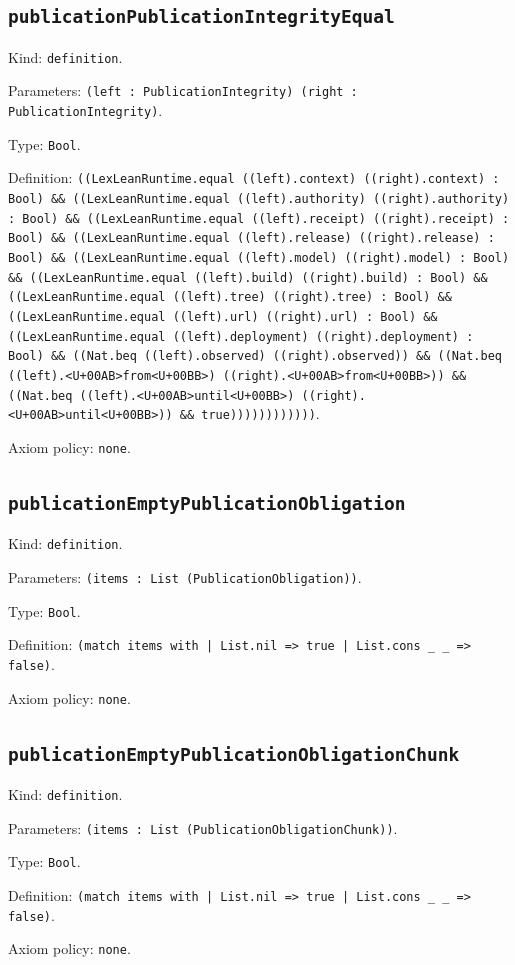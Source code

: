 \documentclass[11pt]{article}
\begin{document}
\subsection*{\texttt{publicationPublicationIntegrityEqual}}
\noindent Kind: \texttt{definition}.\par
\noindent Parameters: \texttt{(left : PublicationIntegrity) (right : PublicationIntegrity)}.\par
\noindent Type: \texttt{Bool}.\par
\noindent Definition: \texttt{((LexLeanRuntime.equal ((left).context) ((right).context) : Bool) \&\& ((LexLeanRuntime.equal ((left).authority) ((right).authority) : Bool) \&\& ((LexLeanRuntime.equal ((left).receipt) ((right).receipt) : Bool) \&\& ((LexLeanRuntime.equal ((left).release) ((right).release) : Bool) \&\& ((LexLeanRuntime.equal ((left).model) ((right).model) : Bool) \&\& ((LexLeanRuntime.equal ((left).build) ((right).build) : Bool) \&\& ((LexLeanRuntime.equal ((left).tree) ((right).tree) : Bool) \&\& ((LexLeanRuntime.equal ((left).url) ((right).url) : Bool) \&\& ((LexLeanRuntime.equal ((left).deployment) ((right).deployment) : Bool) \&\& ((Nat.beq ((left).observed) ((right).observed)) \&\& ((Nat.beq ((left).<U+00AB>from<U+00BB>) ((right).<U+00AB>from<U+00BB>)) \&\& ((Nat.beq ((left).<U+00AB>until<U+00BB>) ((right).<U+00AB>until<U+00BB>)) \&\& true))))))))))))}.\par
\noindent Axiom policy: \texttt{none}.\par
\subsection*{\texttt{publicationEmptyPublicationObligation}}
\noindent Kind: \texttt{definition}.\par
\noindent Parameters: \texttt{(items : List (PublicationObligation))}.\par
\noindent Type: \texttt{Bool}.\par
\noindent Definition: \texttt{(match items with | List.nil => true | List.cons \_ \_ => false)}.\par
\noindent Axiom policy: \texttt{none}.\par
\subsection*{\texttt{publicationEmptyPublicationObligationChunk}}
\noindent Kind: \texttt{definition}.\par
\noindent Parameters: \texttt{(items : List (PublicationObligationChunk))}.\par
\noindent Type: \texttt{Bool}.\par
\noindent Definition: \texttt{(match items with | List.nil => true | List.cons \_ \_ => false)}.\par
\noindent Axiom policy: \texttt{none}.\par
\end{document}
